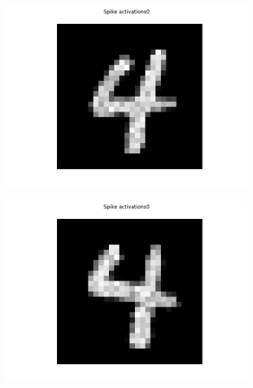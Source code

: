 \begin{figure}[h!]
	\centering
	\begin{subfigure}{.24\textwidth}
  		\centering
  		\includegraphics[width=\linewidth]{imgs/convert/err/err1.png}
  		\label{fig:sub1}
	\end{subfigure}%
	\begin{subfigure}{.24\textwidth}
  		\centering
  		\includegraphics[width=\linewidth]{imgs/convert/err/err2.png}
  		\label{fig:sub1}
	\end{subfigure}%
	\begin{subfigure}{.24\textwidth}
  		\centering

\end{subfigure}
\end{figure}

